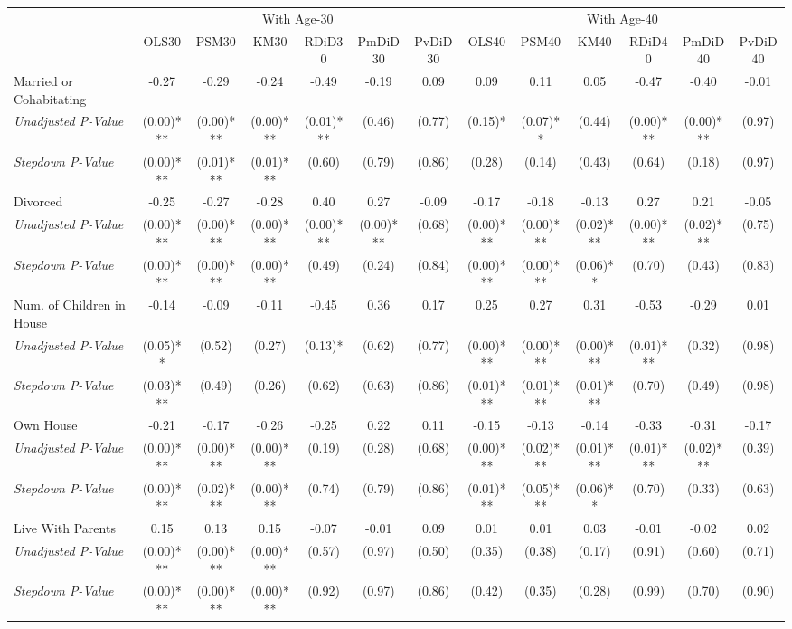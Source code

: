\begin{tabular}{l c c c c c c c c c c c c}
\toprule
& \multicolumn{6}{c}{With Age-30} & \multicolumn{6}{c}{With Age-40} \\\cmidrule(lr){2-7} \cmidrule(lr){8-13}
 & OLS30 & PSM30 & KM30 & RDiD30 & PmDiD30 & PvDiD30 & OLS40 & PSM40 & KM40 & RDiD40 & PmDiD40 & PvDiD40 \\
\midrule
Married or Cohabitating & -0.27 & -0.29 & -0.24 & -0.49 & -0.19 & 0.09 & 0.09 & 0.11 & 0.05 & -0.47 & -0.40 & -0.01 \\
\quad \textit{Unadjusted P-Value} & (0.00)*** & (0.00)*** & (0.00)*** & (0.01)*** & (0.46) & (0.77) & (0.15)* & (0.07)** & (0.44) & (0.00)*** & (0.00)*** & (0.97) \\
\quad \textit{Stepdown P-Value} & (0.00)*** & (0.01)*** & (0.01)*** & (0.60) & (0.79) & (0.86) & (0.28) & (0.14) & (0.43) & (0.64) & (0.18) & (0.97) \\
Divorced & -0.25 & -0.27 & -0.28 & 0.40 & 0.27 & -0.09 & -0.17 & -0.18 & -0.13 & 0.27 & 0.21 & -0.05 \\
\quad \textit{Unadjusted P-Value} & (0.00)*** & (0.00)*** & (0.00)*** & (0.00)*** & (0.00)*** & (0.68) & (0.00)*** & (0.00)*** & (0.02)*** & (0.00)*** & (0.02)*** & (0.75) \\
\quad \textit{Stepdown P-Value} & (0.00)*** & (0.00)*** & (0.00)*** & (0.49) & (0.24) & (0.84) & (0.00)*** & (0.00)*** & (0.06)** & (0.70) & (0.43) & (0.83) \\
Num. of Children in House & -0.14 & -0.09 & -0.11 & -0.45 & 0.36 & 0.17 & 0.25 & 0.27 & 0.31 & -0.53 & -0.29 & 0.01 \\
\quad \textit{Unadjusted P-Value} & (0.05)** & (0.52) & (0.27) & (0.13)* & (0.62) & (0.77) & (0.00)*** & (0.00)*** & (0.00)*** & (0.01)*** & (0.32) & (0.98) \\
\quad \textit{Stepdown P-Value} & (0.03)*** & (0.49) & (0.26) & (0.62) & (0.63) & (0.86) & (0.01)*** & (0.01)*** & (0.01)*** & (0.70) & (0.49) & (0.98) \\
Own House & -0.21 & -0.17 & -0.26 & -0.25 & 0.22 & 0.11 & -0.15 & -0.13 & -0.14 & -0.33 & -0.31 & -0.17 \\
\quad \textit{Unadjusted P-Value} & (0.00)*** & (0.00)*** & (0.00)*** & (0.19) & (0.28) & (0.68) & (0.00)*** & (0.02)*** & (0.01)*** & (0.01)*** & (0.02)*** & (0.39) \\
\quad \textit{Stepdown P-Value} & (0.00)*** & (0.02)*** & (0.00)*** & (0.74) & (0.79) & (0.86) & (0.01)*** & (0.05)*** & (0.06)** & (0.70) & (0.33) & (0.63) \\
Live With Parents & 0.15 & 0.13 & 0.15 & -0.07 & -0.01 & 0.09 & 0.01 & 0.01 & 0.03 & -0.01 & -0.02 & 0.02 \\
\quad \textit{Unadjusted P-Value} & (0.00)*** & (0.00)*** & (0.00)*** & (0.57) & (0.97) & (0.50) & (0.35) & (0.38) & (0.17) & (0.91) & (0.60) & (0.71) \\
\quad \textit{Stepdown P-Value} & (0.00)*** & (0.00)*** & (0.00)*** & (0.92) & (0.97) & (0.86) & (0.42) & (0.35) & (0.28) & (0.99) & (0.70) & (0.90) \\
\bottomrule
\end{tabular}
